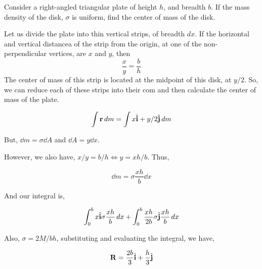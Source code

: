 \begin{example}
    Consider a right-angled triangular plate of height \(h\), and breadth \(b\). If the mass density 
    of the disk, \(\sigma\) is uniform, find the center of mass of the disk.


    \begin{soln}
        Let us divide the plate into thin vertical strips, of breadth \(dx\). If the horizontal and vertical distancea of 
        the strip from the origin, at one of the non-perpendicular vertices, are \(x\) and \(y\), then
        \begin{equation*}
            \frac{x}{y} = \frac{b}{h}
        \end{equation*} 
        The center of mass of this strip is located at the midpoint of this disk, at \(y/2\).
        So, we can reduce each of these strips into their com and then calculate the center of mass of the plate.

        \begin{equation*}
            \int \boldsymbol{\mathbf{r}} \mathop{}\!{d}{m} = \int x \hat{\boldsymbol{\mathbf{i}}} + y/2 \hat{\boldsymbol{\mathbf{j}}} \mathop{}\!{d}{m}
        \end{equation*}

        But, \(\dd{m} = \sigma \dd{A}\) and \(\dd{A} = y \dd{x}\). 

        However, we also have, \(x/y = b/h \iff y = xh/b\). Thus, 

        \begin{equation*}
            \dd{m} = \sigma \frac{xh}{b} \dd{x}
        \end{equation*}

        And our integral is,

        \begin{equation*}
            \int_{0}^{b} x \hat{\boldsymbol{\mathbf{i}}} \sigma \frac{xh}{b} \mathop{}\!{d}{x}+ \int_{0}^b \frac{xh}{2b} \sigma \hat{\boldsymbol{\mathbf{j}}} \frac{xh}{b} \mathop{}\!{d}{x}
        \end{equation*}

        Also, \(\sigma = 2M/bh\), substituting and evaluating the integral, we have,

        \begin{equation}
            \boldsymbol{\mathbf{R}} = \frac{2b}{3} \hat{\boldsymbol{\mathbf{i}}} + \frac{h}{3} \hat{\boldsymbol{\mathbf{j}}}
        \end{equation}

    \end{soln}
\end{example}
